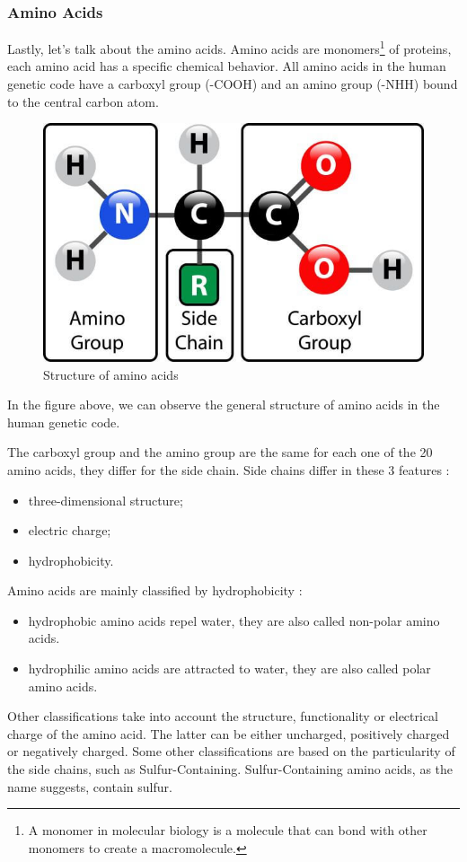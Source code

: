 \subsubsection{Amino Acids}
Lastly, let's talk about the amino acids.
Amino acids are monomers\footnote{A monomer in molecular biology is a molecule that can bond with other monomers to create a macromolecule. } of proteins, each amino acid has a specific chemical behavior.
All amino acids in the human genetic code have a carboxyl group (-COOH) and an amino group (-NHH) bound to the central carbon atom. 

\vspace{2em}

\begin{figure}[h!]
	\includegraphics[scale=0.6]{res/proteins_overview/amino_structure.png}
	\centering
	\caption{Structure of amino acids}
\end{figure}

In the figure above, we can observe the general structure of amino acids in the human genetic code.

The carboxyl group and the amino group are the same for each one of the 20 amino acids, they differ for the side chain. Side chains differ in these 3 features :
\begin{itemize}
	\item three-dimensional structure;
	\item electric charge;
	\item hydrophobicity.
\end{itemize}

Amino acids are mainly classified by hydrophobicity :
\begin{itemize}
	\item hydrophobic amino acids repel water, they are also called non-polar amino acids. 
	\item hydrophilic amino acids are attracted to water, they are also called polar amino acids.
\end{itemize}
\pagebreak
Other classifications take into account the structure, functionality or electrical charge of the amino acid. The latter can be either uncharged, positively charged or negatively charged.
Some other classifications are based on the particularity of the side chains, such as Sulfur-Containing. Sulfur-Containing amino acids, as the name suggests, contain sulfur. 

